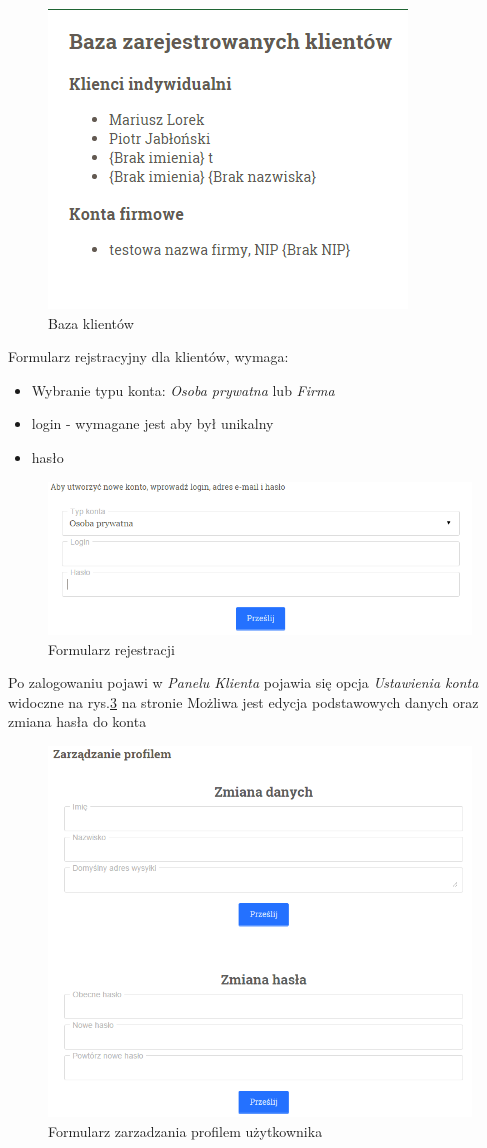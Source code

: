 \begin{figure}[H]
	\centering
	\includegraphics {fig/baza_klientow}
	\caption{Baza klientów}
	\label{fig:baza_klient}
\end{figure}
Formularz rejstracyjny dla klientów, wymaga:
\begin{itemize}
\item Wybranie typu konta: \textit{Osoba prywatna} lub \textit{Firma}
\item login - wymagane jest aby był unikalny
\item hasło	
\end{itemize}
\begin{figure}[H]
	\centering
	\includegraphics [width=15cm] {fig/rejestracja}
	\caption{Formularz rejestracji}
	\label{fig:rejestracja}
\end{figure}
Po zalogowaniu pojawi w \textit{Panelu Klienta} pojawia się opcja \textit{Ustawienia konta}
widoczne na rys.\ref*{fig:profil_zarz} na stronie \pageref{fig:profil_zarz} Możliwa jest edycja podstawowych danych oraz zmiana hasła do konta
\begin{figure}[H]
	\centering
	\includegraphics [width=15cm]{fig/zarzadzanie_profilem}
	\caption{Formularz zarzadzania profilem użytkownika}
	\label{fig:profil_zarz}
\end{figure}